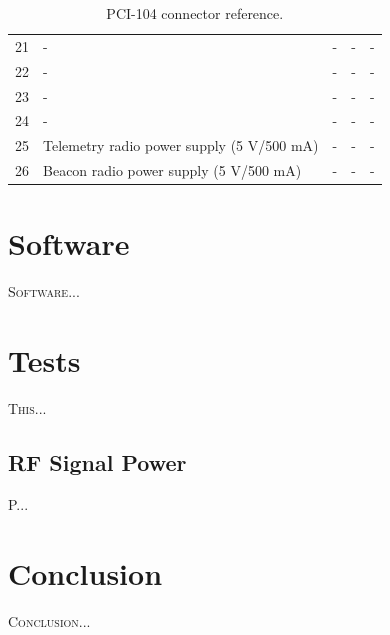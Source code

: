 \documentclass[12pt]{book}
\begin{document}
\begin{table}[!h]
\begin{center}
\begin{tabular}{L{1cm} C{3cm} C{3cm} C{3cm} C{3cm}}
			21 & - & - & - & - \\
			22 & - & - & - & - \\
			23 & - & - & - & - \\
			24 & - & - & - & - \\
			25 & Telemetry radio power supply (5 V/500 mA) & - & - & - \\
			26 & Beacon radio power supply (5 V/500 mA) & - & - & - \\
			\bottomrule[1.5pt]
		\end{tabular}
		\caption{PCI-104 connector reference.}
		\label{tab:pci104-ref}
	\end{center}
\end{table}


\chapter{Software}

\lettrine{S}{oftware}...


\chapter{Tests}

\lettrine{T}{his}...

\section{RF Signal Power}

P...


\chapter{Conclusion} \label{ch:conclusion}

\lettrine{C}{onclusion}...



\end{document}
